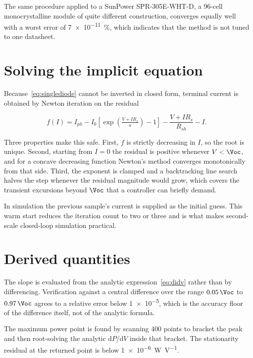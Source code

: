 The same procedure applied to a SunPower SPR-305E-WHT-D, a 96-cell
monocrystalline module of quite different construction, converges equally well
with a worst error of \SI{7e-11}{\percent}, which indicates that the method is
not tuned to one datasheet.

\section{Solving the implicit equation}
\label{sec:solver}

Because~\eqref{eq:singlediode} cannot be inverted in closed form, terminal
current is obtained by Newton iteration on the residual

\begin{equation}
f(I) = I_{ph} - I_0\left[\exp\!\left(\tfrac{V + I R_s}{a}\right) - 1\right] - \frac{V + I R_s}{R_{sh}} - I .
\end{equation}

Three properties make this safe. First, $f$ is strictly decreasing in $I$, so
the root is unique. Second, starting from $I = 0$ the residual is positive
whenever $V < \Voc$, and for a concave decreasing function Newton's method
converges monotonically from that side. Third, the exponent is clamped and a
backtracking line search halves the step whenever the residual magnitude would
grow, which covers the transient excursions beyond $\Voc$ that a controller can
briefly demand.

In simulation the previous sample's current is supplied as the initial guess.
This warm start reduces the iteration count to two or three and is what makes
second-scale closed-loop simulation practical.

\section{Derived quantities}

The slope is evaluated from the analytic expression~\eqref{eq:didv} rather than
by differencing. Verification against a central difference over the range
$0.05\,\Voc$ to $0.97\,\Voc$ agrees to a relative error below \num{1e-5}, which
is the accuracy floor of the difference itself, not of the analytic formula.

The maximum power point is found by scanning \num{400} points to bracket the
peak and then root-solving the analytic $\mathrm{d}P/\mathrm{d}V$ inside that
bracket. The stationarity residual at the returned point is below
\SI{1e-6}{\watt\per\volt}.

